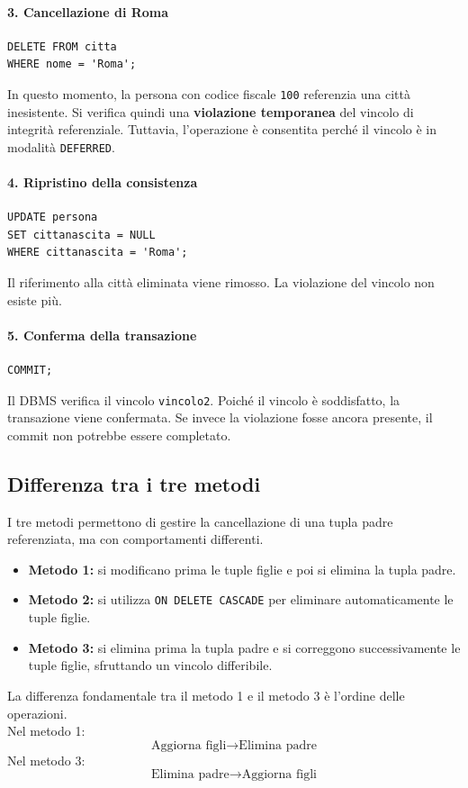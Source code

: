 \paragraph{3. Cancellazione di Roma}
\begin{verbatim}
DELETE FROM citta
WHERE nome = 'Roma';
\end{verbatim}
In questo momento, la persona
con codice fiscale \texttt{100}
referenzia una città inesistente.
Si verifica quindi una
\textbf{violazione temporanea}
del vincolo di integrità referenziale.
Tuttavia, l'operazione è consentita
perché il vincolo è in modalità
\texttt{DEFERRED}.
\paragraph{4. Ripristino della consistenza}
\begin{verbatim}
UPDATE persona
SET cittanascita = NULL
WHERE cittanascita = 'Roma';
\end{verbatim}
Il riferimento alla città
eliminata viene rimosso.
La violazione del vincolo
non esiste più.
\paragraph{5. Conferma della transazione}
\begin{verbatim}
COMMIT;
\end{verbatim}
Il DBMS verifica il vincolo
\texttt{vincolo2}.
Poiché il vincolo è soddisfatto,
la transazione viene confermata.
Se invece la violazione
fosse ancora presente,
il commit non potrebbe
essere completato.
\subsection{Differenza tra i tre metodi}
I tre metodi permettono
di gestire la cancellazione
di una tupla padre referenziata,
ma con comportamenti differenti.
\begin{itemize}
    \item \textbf{Metodo 1:}
    si modificano prima
    le tuple figlie e poi
    si elimina la tupla padre.
    \item \textbf{Metodo 2:}
    si utilizza
    \texttt{ON DELETE CASCADE}
    per eliminare automaticamente
    le tuple figlie.

    \item \textbf{Metodo 3:}
    si elimina prima la tupla padre
    e si correggono successivamente
    le tuple figlie, sfruttando
    un vincolo differibile.
\end{itemize}
\noindent La differenza fondamentale
tra il metodo 1 e il metodo 3
è l'ordine delle operazioni.\\
Nel metodo 1:
\[
\boxed{
\text{Aggiorna figli}
\rightarrow
\text{Elimina padre}
}
\]
Nel metodo 3:
\[
\boxed{
\text{Elimina padre}
\rightarrow
\text{Aggiorna figli}
}
\]
